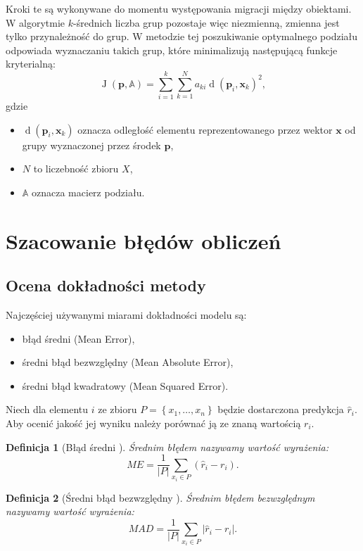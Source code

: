\documentclass[12pt,a4paper]{report}
\newtheorem{df}{Definicja}[chapter]
\newcommand{\set}[1]{\left\lbrace {#1} \right\rbrace}
\newcommand{\J}[2]{\operatorname{J}\left({#1}, {#2} \right)}
\newcommand{\distance}[2]{\operatorname{d}\left({#1}, {#2} \right)}
\begin{document}
Kroki te są wykonywane do momentu występowania migracji między obiektami.
W algorytmie $k$-średnich liczba grup pozostaje więc niezmienną, zmienna jest tylko przynależność do grup.
W metodzie tej poszukiwanie optymalnego podziału odpowiada wyznaczaniu takich grup, które minimalizują następującą funkcje kryterialną:
$$
\J{\mathbf{p}}{\mathbb{A}} = \sum_{i=1}^k \sum_{k=1}^N a_{ki}\distance{\mathbf{p}_i}{\mathbf{x}_k}^2,
$$
gdzie 
\begin{itemize}
\item $\distance{\mathbf{p}_i}{\mathbf{x}_k}$ oznacza odległość elementu reprezentowanego przez wektor $\mathbf{x}$ od grupy wyznaczonej przez środek $\mathbf{p}$,
\item $N$ to liczebność zbioru $\mathit{X}$,
\item $\mathbb{A}$ oznacza macierz podziału.
\end{itemize}
 
\section{Szacowanie błędów obliczeń}
\subsection{Ocena dokładności metody}%
Najczęściej używanymi miarami dokładności modelu są:
\begin{itemize}
\item błąd średni (Mean Error),
\item średni błąd bezwzględny (Mean Absolute Error),
\item średni błąd kwadratowy (Mean Squared Error).
\end{itemize}

Niech dla elementu $i$ ze zbioru $\mathit{P} = \set{x_1, \ldots, x_n}$ będzie dostarczona predykcja $\widehat{r}_i$. Aby ocenić jakość jej wyniku należy porównać ją ze znaną wartością $r_i$.

\begin{df}[Błąd średni {\citep[Sec 4.1.1]{rsh}}]
Średnim błędem nazywamy wartość wyrażenia:
$$
ME = \frac{1}{|\mathit{P}|}\sum_{x_i \in \mathit{P}}(\widehat{r}_i-r_i).
$$
\end{df}

\begin{df}[Średni błąd bezwzględny  {\citep[Sec 4.1.1]{rsh}}]
Średnim błędem bezwzględnym nazywamy wartość wyrażenia:
$$
MAD = \frac{1}{|\mathit{P}|}\sum_{x_i \in \mathit{P}}|\widehat{r}_i-r_i|.
$$
\end{df}
\end{document}
